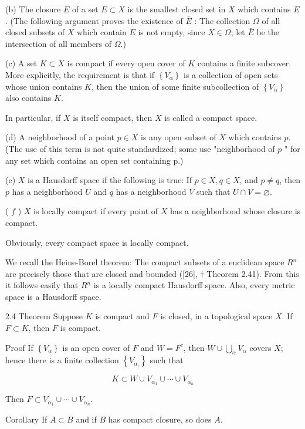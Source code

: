 \documentclass[10pt]{article}
\begin{document}
(b) The closure $\bar{E}$ of a set $E \subset X$ is the smallest closed set in $X$ which contains $E$. (The following argument proves the existence of $\bar{E}$ : The collection $\Omega$ of all closed subsets of $X$ which contain $E$ is not empty, since $X \in \Omega$; let $\bar{E}$ be the intersection of all members of $\Omega$.)

(c) A set $K \subset X$ is compact if every open cover of $K$ contains a finite subcover. More explicitly, the requirement is that if $\left\{V_{\alpha}\right\}$ is a collection of open sets whose union contains $K$, then the union of some finite subcollection of $\left\{V_{\alpha}\right\}$ also contains $K$.

In particular, if $X$ is itself compact, then $X$ is called a compact space.

(d) A neighborhood of a point $p \in X$ is any open subset of $X$ which contains $p$. (The use of this term is not quite standardized; some use
"neighborhood of $p$ " for any set which contains an open set containing p.)

(e) $X$ is a Hausdorff space if the following is true: If $p \in X, q \in X$, and $p \neq q$, then $p$ has a neighborhood $U$ and $q$ has a neighborhood $V$ such that $U \cap V=\varnothing$.

( $f$ ) $X$ is locally compact if every point of $X$ has a neighborhood whose closure is compact.

Obviously, every compact space is locally compact.

We recall the Heine-Borel theorem: The compact subsets of a euclidean space $R^{n}$ are precisely those that are closed and bounded ([26], $\dagger$ Theorem 2.41). From this it follows easily that $R^{n}$ is a locally compact Hausdorff space. Also, every metric space is a Hausdorff space.

2.4 Theorem Suppose $K$ is compact and $F$ is closed, in a topological space $X$. If $F \subset K$, then $F$ is compact.

Proof If $\left\{V_{\alpha}\right\}$ is an open cover of $F$ and $W=F^{c}$, then $W \cup \bigcup_{\alpha} V_{\alpha}$ covers $X$; hence there is a finite collection $\left\{V_{\alpha_{i}}\right\}$ such that

$$
K \subset W \cup V_{\alpha_{1}} \cup \cdots \cup V_{\alpha_{n}}
$$

Then $F \subset V_{\alpha_{1}} \cup \cdots \cup V_{\alpha_{n}}$.

Corollary If $A \subset B$ and if $B$ has compact closure, so does $A$.
\end{document}
